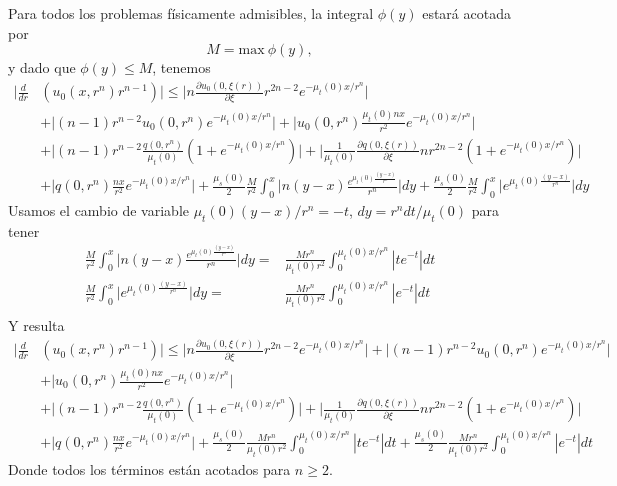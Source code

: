 Para todos los problemas físicamente admisibles, la 
integral $\phi(y)$ estará acotada por
\begin{equation}
M=\text{max}~\phi(y),
\end{equation}
y dado que $\phi(y)\leq M$, tenemos
\begin{equation}
\begin{split}
 \Bigg| \frac{d }{dr}& \left( u_0(x,r^n) r^{n-1} \right) \Bigg| \leq 
 \Bigg| n\frac{\partial u_0(0,\xi(r))}{\partial \xi}r^{2n-2}e^{-\mu_t(0)x/r^n}\Bigg|\\
&+\Bigg| (n-1) r^{n-2}u_0(0,r^n)e^{-\mu_t(0)x/r^n}\Bigg| +\Bigg|u_0(0,r^n)\frac{\mu_t(0)nx}{r^{2}}e^{-\mu_t(0)x/r^n}\Bigg|\\
& + \Bigg|(n-1)r^{n-2}\frac{q(0,r^n)}{\mu_t(0)} \left( 1+e^{-\mu_t(0)x/r^n} \right)\Bigg|+
\Bigg|\frac{1}{\mu_t(0)}\frac{\partial q(0,\xi(r))}{\partial \xi} nr^{2n-2} (1+e^{-\mu_t(0)x/r^n})\Bigg|\\&+\Bigg|q(0,r^n)\frac{nx}{r^{2}}e^{-\mu_t(0)x/r^n}\Bigg|+\frac{\mu_s(0)}{2}\frac{M}{r^2}  \int_0^{x} \Bigg| n(y-x) \frac{e^{\mu_t(0)\frac{(y-x)}{r^n}}}{r^n}\Bigg| dy 
+ \frac{\mu_s(0)}{2} \frac{M}{r^2} \int_0^{x} \Bigg| e^{\mu_t(0)\frac{(y-x)}{r^n}} \Bigg| dy 
\end{split}
\label{eq:bounding2}
\end{equation}
Usamos el cambio de variable $\mu_t(0)(y-x)/r^n=-t$, $dy=r^n dt/\mu_t(0)$ para tener
\begin{equation}
\begin{split}
\frac{M}{r^2}  \int_0^{x} \Bigg| n(y-x) \frac{e^{\mu_t(0)\frac{(y-x)}{r^n}}}{r^n}\Bigg| dy=&\frac{M r^n}{\mu_t(0) r^2}  \int_0^{\mu_t(0)x/r^n} | te^{-t} |dt \\
\frac{M}{r^2} \int_0^{x} \Bigg| e^{\mu_t(0)\frac{(y-x)}{r^n}} \Bigg| dy 
=&\frac{M r^n}{\mu_t(0) r^2}  \int_0^{\mu_t(0) x/r^n} |e^{-t}|dt \\
\end{split}
\label{eq:bounding2aux}
\end{equation}
Y resulta
\begin{equation}
\begin{split}
 \Bigg| \frac{d }{dr}& \left( u_0(x,r^n) r^{n-1} \right) \Bigg| \leq 
 \Bigg| n\frac{\partial u_0(0,\xi(r))}{\partial \xi}r^{2n-2}e^{-\mu_t(0)x/r^n}\Bigg| +\Bigg| (n-1) r^{n-2}u_0(0,r^n)e^{-\mu_t(0)x/r^n}\Bigg|\\
& +\Bigg|u_0(0,r^n)\frac{\mu_t(0)nx}{r^{2}}e^{-\mu_t(0)x/r^n}\Bigg|\\
& + \Bigg|(n-1)r^{n-2}\frac{q(0,r^n)}{\mu_t(0)} \left( 1+e^{-\mu_t(0)x/r^n} \right)\Bigg|+
\Bigg|\frac{1}{\mu_t(0)}\frac{\partial q(0,\xi(r))}{\partial \xi} nr^{2n-2} (1+e^{-\mu_t(0)x/r^n})\Bigg|\\&+\Bigg|q(0,r^n)\frac{nx}{r^{2}}e^{-\mu_t(0)x/r^n}\Bigg|+\frac{\mu_s(0)}{2}\frac{M r^n}{\mu_t(0) r^2}  \int_0^{\mu_t(0)x/r^n} | te^{-t} |dt 
+ \frac{\mu_s(0)}{2} \frac{M r^n}{\mu_t(0)r^2}  \int_0^{\mu_t(0)x/r^n} |e^{-t}|dt
\end{split}
\label{eq:bounding2}
\end{equation}
Donde todos los términos están acotados para $n\geq 2$.


